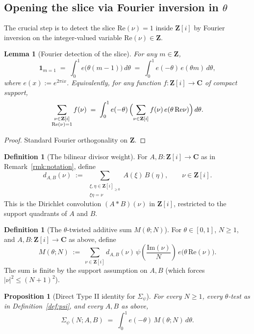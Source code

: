 \documentclass[11pt]{article}
\newtheorem{lemma}[theorem]{Lemma}
\newtheorem{proposition}[theorem]{Proposition}
\theoremstyle{definition}
\newtheorem{definition}[theorem]{Definition}
\newcommand{\Z}{\mathbf{Z}}
\newcommand{\C}{\mathbf{C}}
\newcommand{\Zi}{\Z[i]}
\renewcommand{\Re}{\mathrm{Re}}
\renewcommand{\Im}{\mathrm{Im}}
\begin{document}
\subsection{Opening the slice via Fourier inversion in $\theta$}\label{ssec:typeII-theta}

The crucial step is to detect the slice $\Re(\nu)=1$ inside $\Zi$ by Fourier inversion on the integer-valued variable $\Re(\nu)\in\Z$.

\begin{lemma}[Fourier detection of the slice]\label{lem:slice-fourier}
For any $m\in\Z$,
\[
\mathbf{1}_{m=1}\;=\;\int_0^1 e\bigl(\theta(m-1)\bigr)\,d\theta\;=\;\int_0^1 e(-\theta)\,e(\theta m)\,d\theta,
\]
where $e(x):=e^{2\pi i x}$. Equivalently, for any function $f:\Zi\to\C$ of compact support,
\[
\sum_{\substack{\nu\in\Zi\\\Re(\nu)=1}}f(\nu)\;=\;\int_0^1 e(-\theta)\,\Bigl(\sum_{\nu\in\Zi}f(\nu)\,e(\theta\,\Re\nu)\Bigr)\,d\theta.
\]
\end{lemma}

\begin{proof}
Standard Fourier orthogonality on $\Z$.
\end{proof}

\begin{definition}[The bilinear divisor weight]\label{def:dAB}
For $A,B:\Zi\to\C$ as in Remark~\ref{rmk:notation}, define
\[
d_{A,B}(\nu)\;:=\;\sum_{\substack{\xi,\eta\in\Zi_{\ge 0}\\ \xi\eta=\nu}}A(\xi)\,B(\eta),\qquad \nu\in\Zi.
\]
This is the Dirichlet convolution $(A*B)(\nu)$ in $\Zi$, restricted to the support quadrants of $A$ and $B$.
\end{definition}

\begin{definition}[The $\theta$-twisted additive sum $M(\theta;N)$]\label{def:Mtheta}
For $\theta\in[0,1]$, $N\ge 1$, and $A,B:\Zi\to\C$ as above, define
\[
M(\theta;N)\;:=\;\sum_{\nu\in\Zi}d_{A,B}(\nu)\,\psi\!\left(\frac{\Im(\nu)}{N}\right)\,e\bigl(\theta\,\Re(\nu)\bigr).
\]
The sum is finite by the support assumption on $A,B$ (which forces $|\nu|^2\le (N+1)^2$).
\end{definition}

\begin{proposition}[Direct Type II identity for $\Sigma_\psi$]\label{prop:Sigma-psi-as-theta-integral}
For every $N\ge 1$, every $\theta$-test as in Definition~\ref{def:psi}, and every $A,B$ as above,
\[
\Sigma_\psi(N;A,B)\;=\;\int_0^1 e(-\theta)\,M(\theta;N)\,d\theta.
\]
\end{proposition}
\end{document}
